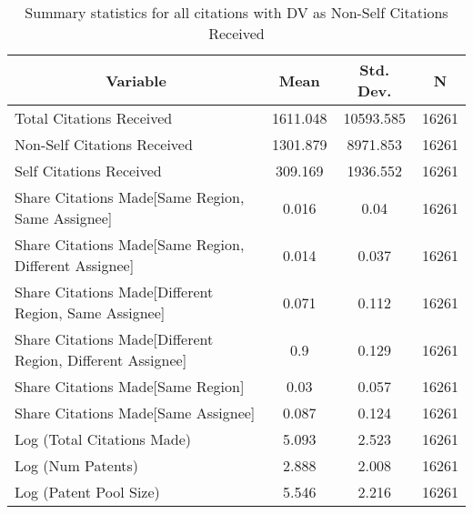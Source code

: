 
\begin{table}[htbp]\centering \caption{Summary statistics for all citations with DV as Non-Self Citations Received \label{a.e.o.t.n.nsummary}}
\begin{tabular}{l c c  c}\hline\hline
\multicolumn{1}{c}{\textbf{Variable}} & \textbf{Mean}
 & \textbf{Std. Dev.} & \textbf{N}\\ \hline
Total Citations Received & 1611.048 & 10593.585  & 16261\\
Non-Self Citations Received & 1301.879 & 8971.853  & 16261\\
Self Citations Received & 309.169 & 1936.552  & 16261\\
Share Citations Made[Same Region, Same Assignee] & 0.016 & 0.04  & 16261\\
Share Citations Made[Same Region, Different Assignee] & 0.014 & 0.037  & 16261\\
Share Citations Made[Different Region, Same Assignee] & 0.071 & 0.112  & 16261\\
Share Citations Made[Different Region, Different Assignee] & 0.9 & 0.129  & 16261\\
Share Citations Made[Same Region] & 0.03 & 0.057  & 16261\\
Share Citations Made[Same Assignee] & 0.087 & 0.124  & 16261\\
Log (Total Citations Made) & 5.093 & 2.523  & 16261\\
Log (Num Patents) & 2.888 & 2.008  & 16261\\
Log (Patent Pool Size) & 5.546 & 2.216  & 16261\\
\hline\end{tabular}
\end{table}

